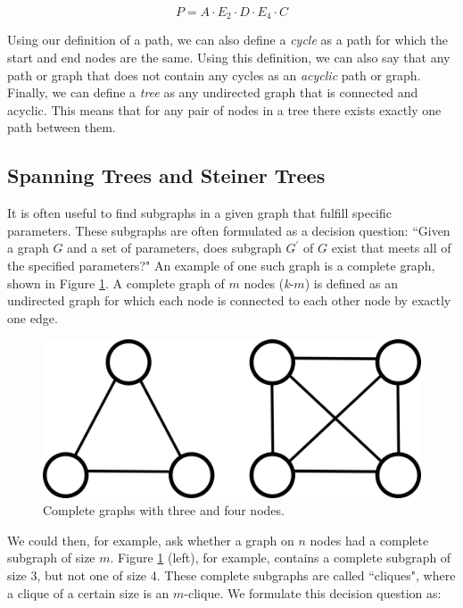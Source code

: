 \documentclass[12pt,twoside]{reedthesis}
\theoremstyle{definition}
\begin{document}
   \begin{equation*}
     P = A \cdot E_2 \cdot D \cdot E_4 \cdot C
   \end{equation*}

   Using our definition of a path, we can also define a \textit{cycle} as a path for which the start and end nodes are the same. Using this definition, we can also say that any path or graph that does not contain any cycles as an \textit{acyclic} path or graph. Finally, we can define a \textit{tree} as any undirected graph that is connected and acyclic. This means that for any pair of nodes in a tree there exists exactly one path between them.\par

   \subsection{Spanning Trees and Steiner Trees}

   It is often useful to find subgraphs in a given graph that fulfill specific parameters. These subgraphs are often formulated as a decision question: ``Given a graph $G$ and a set of parameters, does subgraph $G^\prime$ of $G$ exist that meets all of the specified parameters?" An example of one such graph is a complete graph, shown in Figure \ref{fig:complete_graphs}. A complete graph of $m$ nodes (\textit{k}-$m$) is defined as an undirected graph for which each node is connected to each other node by exactly one edge.

   \begin{figure}[!h]
     \begin{center}
       \includegraphics[width=\textwidth/2]{complete_graphs}
     \caption[Complete Graphs \textit{k}-3 and \textit{k}-4.]{Complete graphs with three and four nodes.}
     \label{fig:complete_graphs}
     \end{center}
   \end{figure}

   We could then, for example, ask whether a graph on $n$ nodes had a complete subgraph of size $m$. Figure \ref{fig:complete_graphs} (left), for example, contains a complete subgraph of size 3, but not one of size 4. These complete subgraphs are called ``cliques", where a clique of a certain size is an $m$-clique. We formulate this decision question as:\par
\end{document}
